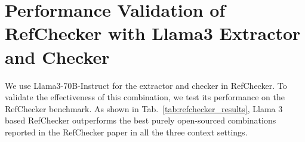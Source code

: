 \section{Performance Validation of RefChecker with Llama3 Extractor and Checker}
\label{appendix:refchecker_validation}

We use Llama3-70B-Instruct  for the extractor and checker in RefChecker. To validate the effectiveness of this combination, we test its performance on the RefChecker benchmark. As shown in Tab.~\ref{tab:refchecker_results}, Llama 3 based RefChecker outperforms the best purely open-sourced combinations reported in the RefChecker paper in all the three context settings.







    

